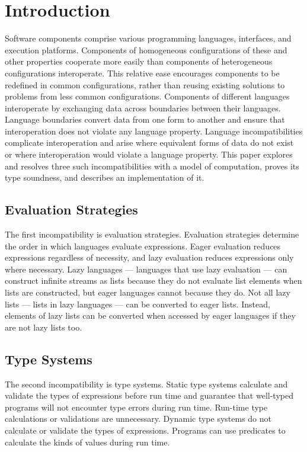 \chapter{Introduction}

Software components comprise various programming languages, interfaces, and execution platforms.  Components of homogeneous configurations of these and other properties cooperate more easily than components of heterogeneous configurations interoperate.  This relative ease encourages components to be redefined in common configurations, rather than reusing existing solutions to problems from less common configurations.  Components of different languages interoperate by exchanging data across boundaries between their languages.  Language boundaries convert data from one form to another and ensure that interoperation does not violate any language property.  Language incompatibilities complicate interoperation and arise where equivalent forms of data do not exist or where interoperation would violate a language property.  This paper explores and resolves three such incompatibilities with a model of computation, proves its type soundness, and describes an implementation of it.

\section{Evaluation Strategies}

The first incompatibility is evaluation strategies.  Evaluation strategies determine the order in which languages evaluate expressions.  Eager evaluation reduces expressions regardless of necessity, and lazy evaluation reduces expressions only where necessary.  Lazy languages --- languages that use lazy evaluation --- can construct infinite streams as lists because they do not evaluate list elements when lists are constructed, but eager languages cannot because they do.  Not all lazy lists --- lists in lazy languages --- can be converted to eager lists.  Instead, elements of lazy lists can be converted when accessed by eager languages if they are not lazy lists too.

\section{Type Systems}

The second incompatibility is type systems.  Static type systems calculate and validate the types of expressions before run time and guarantee that well-typed programs will not encounter type errors during run time.  Run-time type calculations or validations are unnecessary.  Dynamic type systems do not calculate or validate the types of expressions.  Programs can use predicates to calculate the kinds of values during run time.

